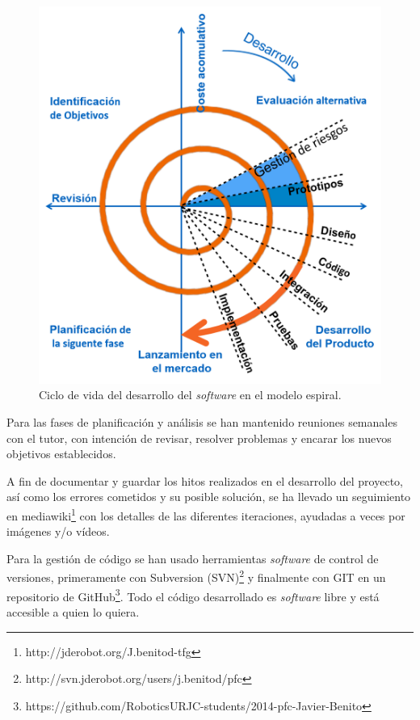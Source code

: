 \begin{figure}[th]
\centering
\includegraphics[scale=0.62]{Figures/spiral.png}
\decoRule
\caption[Ciclo de vida en espiral]{Ciclo de vida del desarrollo del \textit{software} en el modelo espiral.}
\label{fig:spiral}
\end{figure}

Para las fases de planificación y análisis se han mantenido reuniones semanales con el tutor, con intención de revisar, resolver problemas y encarar los nuevos objetivos establecidos.

A fin de documentar y guardar los hitos realizados en el desarrollo del proyecto, así como los errores cometidos y su posible solución, se ha llevado un seguimiento en mediawiki\footnote{http://jderobot.org/J.benitod-tfg} con los detalles de las diferentes iteraciones, ayudadas a veces por imágenes y/o vídeos.

Para la gestión de código se han usado herramientas \textit{software} de control de versiones, primeramente con Subversion (SVN)\footnote{http://svn.jderobot.org/users/j.benitod/pfc} y finalmente con GIT en un repositorio de GitHub\footnote{https://github.com/RoboticsURJC-students/2014-pfc-Javier-Benito}. Todo el código desarrollado es \textit{software} libre y está accesible a quien lo quiera.

